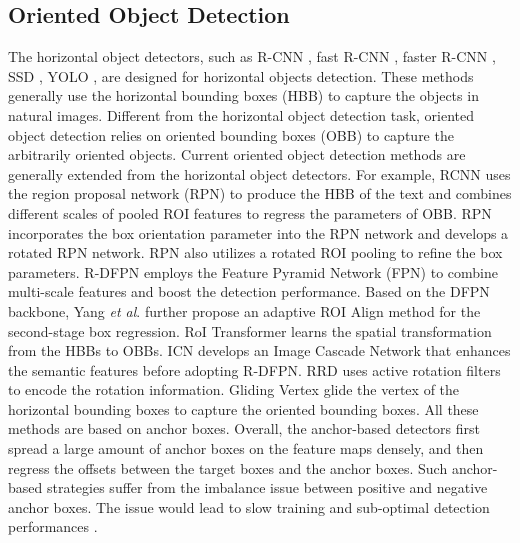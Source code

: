 \documentclass[10pt,twocolumn,letterpaper]{article}
\begin{document}
\subsection{Oriented Object Detection}
The horizontal object detectors, such as R-CNN \cite{ma2015hierarchical}, fast R-CNN \cite{girshick2015fast}, faster R-CNN \cite{ren2015faster}, SSD \cite{liu2016ssd}, YOLO \cite{redmon2016you}, are designed for horizontal objects detection. These methods generally use the horizontal bounding boxes (HBB) to capture the objects in natural images. Different from the horizontal object detection task, oriented object detection relies on oriented bounding boxes (OBB) to capture the arbitrarily oriented objects. Current oriented object detection methods are generally extended from the horizontal object detectors. For example, RCNN \cite{jiang2017r2cnn} uses the region proposal network (RPN) to produce the HBB of the text and combines different scales of pooled ROI features to regress the parameters of OBB. RPN \cite{zhang2018toward} incorporates the box orientation parameter into the RPN network and develops a rotated RPN network. RPN also utilizes a rotated ROI pooling to refine the box parameters.  R-DFPN \cite{yang2018automatic} employs the Feature Pyramid Network (FPN) \cite{lin2017feature} to combine multi-scale features and boost the detection performance. Based on the DFPN backbone, Yang \textit{et al}. \cite{yang2018position} further propose an adaptive ROI Align method for the second-stage box regression. RoI Transformer \cite{ding2019learning} learns the spatial transformation from the HBBs to OBBs. ICN \cite{azimi2018towards} develops an Image Cascade Network that enhances the semantic features before adopting R-DFPN. RRD \cite{liao2018rotation} uses active rotation filters to encode the rotation information. Gliding Vertex \cite{xu2020gliding} glide the vertex of the horizontal bounding boxes to capture the oriented bounding boxes. All these methods are based on anchor boxes. Overall, the anchor-based detectors first spread a large amount of anchor boxes on the feature maps densely, and then regress the offsets between the target boxes and the anchor boxes. Such anchor-based strategies suffer from the imbalance issue between positive and negative anchor boxes. The issue would lead to slow training and sub-optimal detection performances \cite{law2018cornernet}. 
\end{document}
